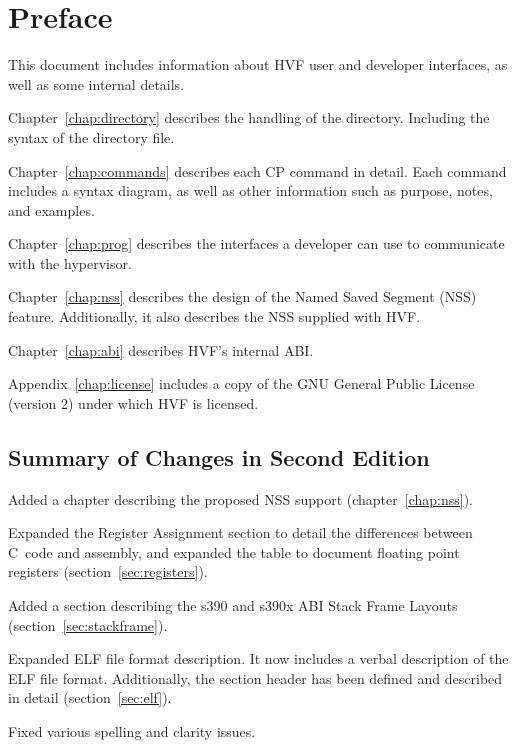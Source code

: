 \chapter*{Preface}
This document includes information about HVF user and developer interfaces,
as well as some internal details.

Chapter~\ref{chap:directory} describes the handling of the directory.
Including the syntax of the directory file.

Chapter~\ref{chap:commands} describes each CP command in detail.  Each
command includes a syntax diagram, as well as other information such as
purpose, notes, and examples.

Chapter~\ref{chap:prog} describes the interfaces a developer can use to
communicate with the hypervisor.

\cbstart
Chapter~\ref{chap:nss} describes the design of the Named Saved Segment (NSS)
feature.  Additionally, it also describes the NSS supplied with HVF.
\cbend

Chapter~\ref{chap:abi} describes HVF's internal ABI.

Appendix~\ref{chap:license} includes a copy of the GNU General Public
License (version 2) under which HVF is licensed.

\cbstart
\section*{Summary of Changes in Second Edition}
Added a chapter describing the proposed NSS support (chapter~\ref{chap:nss}).

Expanded the Register Assignment section to detail the differences between
C~code and assembly, and expanded the table to document floating point
registers (section~\ref{sec:registers}).

Added a section describing the s390 and s390x ABI Stack Frame Layouts
(section~\ref{sec:stackframe}).

Expanded ELF file format description.  It now includes a verbal description
of the ELF file format.  Additionally, the section header has been defined
and described in detail (section~\ref{sec:elf}).

Fixed various spelling and clarity issues.
\cbend
